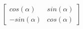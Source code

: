 \documentclass[preview]{standalone}
\begin{document}
\begin{align*}
\begin{bmatrix} cos(\alpha) & sin(\alpha) \\ -sin(\alpha) & cos(\alpha)\end{bmatrix}
\end{align*}
\end{document}
